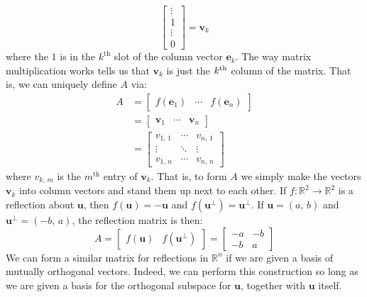 \documentclass{article}
\theoremstyle{normal}
\newenvironment{example}{%
    \pushQED{\qed}\renewcommand{\qedsymbol}{$\blacksquare$}\examplex%
}{%
    \popQED\endexamplex%
}
\begin{document}
\begin{example}[\textbf{Reflection Matrix}]
\begin{equation}
\begin{bmatrix}
                \vdots\\
                1\\
                \vdots\\
                0
            \end{bmatrix}
            =\mathbf{v}_{k}
        \end{equation}
        where the $1$ is in the $k^{\textrm{th}}$ slot of the column vector
        $\mathbf{e}_{k}$. The way matrix multiplication works tells us that
        $\mathbf{v}_{k}$ is just the $k^{\small\textrm{th}}$
        column of the matrix. That is, we can uniquely define $A$ via:
        \begin{align}
            A&=
            \begin{bmatrix}
                f(\mathbf{e}_{1})&\cdots&f(\mathbf{e}_{n})
            \end{bmatrix}\\
            &=
            \begin{bmatrix}
                \mathbf{v}_{1}&\cdots&\mathbf{v}_{n}
            \end{bmatrix}\\
            &=
            \begin{bmatrix}
                v_{1,\,1}&\cdots&v_{n,\,1}\\
                \vdots&\ddots&\vdots\\
                v_{1,\,n}&\cdots&v_{n,\,n}
            \end{bmatrix}
        \end{align}
        where $v_{k,\,m}$ is the $m^{\textrm{th}}$
        entry of $\mathbf{v}_{k}$. That is,
        to form $A$ we simply make the vectors $\mathbf{v}_{k}$ into column
        vectors and stand them up next to each other. If
        $f:\mathbb{R}^{2}\rightarrow\mathbb{R}^{2}$ is a reflection about
        $\mathbf{u}$, then $f(\mathbf{u})=-\mathbf{u}$ and
        $f(\mathbf{u}^{\perp})=\mathbf{u}^{\perp}$. If
        $\mathbf{u}=(a,\,b)$ and $\mathbf{u}^{\perp}=(-b,\,a)$, the reflection
        matrix is then:
        \begin{equation}
            A=
            \begin{bmatrix}
                f(\mathbf{u})&f(\mathbf{u}^{\perp})
            \end{bmatrix}
            =
            \begin{bmatrix}
                -a&-b\\
                -b&a
            \end{bmatrix}
        \end{equation}
        We can form a similar matrix for reflections in $\mathbb{R}^{n}$ if we
        are given a basis of mutually orthogonal vectors. Indeed, we can
        perform this construction so long as we are given a basis for
        the orthogonal subspace for $\mathbf{u}$, together with
        $\mathbf{u}$ itself.
    \end{example}
\end{document}
